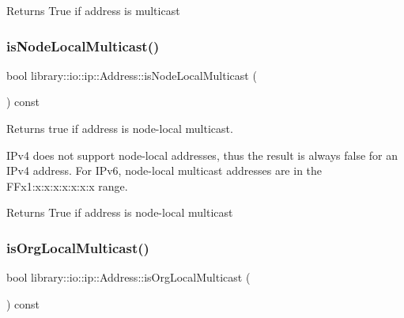 \begin{DoxyReturn}{Returns}
True if address is multicast 
\end{DoxyReturn}
\mbox{\label{classlibrary_1_1io_1_1ip_1_1_address_ac2991f8db5e979f2f167b56a149bc010}} 
\subsubsection{\texorpdfstring{is\+Node\+Local\+Multicast()}{isNodeLocalMulticast()}}
{\footnotesize\ttfamily bool library\+::io\+::ip\+::\+Address\+::is\+Node\+Local\+Multicast (\begin{DoxyParamCaption}{ }\end{DoxyParamCaption}) const}



Returns true if address is node-\/local multicast. 

I\+Pv4 does not support node-\/local addresses, thus the result is always false for an I\+Pv4 address. For I\+Pv6, node-\/local multicast addresses are in the F\+Fx1\+:x\+:x\+:x\+:x\+:x\+:x\+:x range.

\begin{DoxyReturn}{Returns}
True if address is node-\/local multicast 
\end{DoxyReturn}
\mbox{\label{classlibrary_1_1io_1_1ip_1_1_address_a3507475aa3a97c63dfe0065eff2307ad}} 
\subsubsection{\texorpdfstring{is\+Org\+Local\+Multicast()}{isOrgLocalMulticast()}}
{\footnotesize\ttfamily bool library\+::io\+::ip\+::\+Address\+::is\+Org\+Local\+Multicast (\begin{DoxyParamCaption}{ }\end{DoxyParamCaption}) const}



